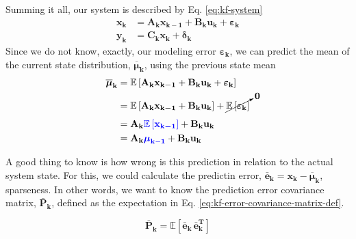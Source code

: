 \documentclass[12pt]{article}
\newcommand{\bvec}[1]{\boldsymbol{\mathbf{#1}}} %
\newcommand{\bvecT}[1]{\boldsymbol{\mathbf{#1^T}}} %
\newcommand{\mat}[1]{\boldsymbol{\mathbf{#1}}}
\newcommand{\brac}[1]{\left[#1\right]} %
\newcommand{\mb}[1]{{\boldsymbol{#1}}} %
\newcommand{\expv}[1]{\mathbb{E}\brac{#1}} %
\newcommand{\blue}[1]{\color{blue}#1\color{black}}
\begin{document}
Summing it all, our system is described by Eq. \ref{eq:kf-system}
\begin{equation}
    \begin{aligned}
        \bvec{x_k} &= \mat{A_k}\bvec{x_{k-1}} + \mat{B_k}\bvec{u_k} + \mb{\varepsilon}_\mathbf{k}\\
        \bvec{y_k} &= \mat{C_k}\bvec{x_k} + \mb{\delta}_\mathbf{k}
    \end{aligned}
    \label{eq:kf-system}
\end{equation}
Since we do not know, exactly, our modeling error $\mb{\varepsilon}_\mathbf{k}$, we can predict the mean of the current state distribution, $\mb{\overline{\mu}}_\mathbf{k}$, using the previous state mean
\begin{equation}
    \begin{aligned}
        \mb{\overline{\mu}}_\mathbf{k} &= \expv{\mat{A_k}\bvec{x_{k-1}} + \mat{B_k}\bvec{u_k} + \mb{\varepsilon}_\mathbf{k}}\\
        & = \expv{\mat{A_k}\bvec{x_{k-1}} + \mat{B_k}\bvec{u_k}} + \cancelto{\mat{0}}{\expv{\mb{\varepsilon}_\mathbf{k}}}\\
        &= \mat{A_k}\blue{\expv{\bvec{x_{k-1}}}} + \mat{B_k}\bvec{u_k}\\
        &= \mat{A_k}\blue{\mb{\mu}_\mathbf{k-1}} + \mat{B_k}\bvec{u_k}
    \end{aligned}
    \label{eq:kf-prdiction}
\end{equation}

A good thing to know is how wrong is this prediction in relation to the actual system state. For this, we could calculate the predictin error, $\bvec{\bar{e}_k} = \bvec{x_k} - \mb{\overline{\mu}}_\mathbf{k}$, sparseness. In other words, we want to know the prediction error covariance matrix, $\mat{\bar{P}_k}$, defined as the expectation in Eq. \ref{eq:kf-error-covariance-matrix-def}.

\begin{equation}
    \mat{\bar{P}_k} = \expv{\bvec{\bar{e}_k} \, \bvecT{\bar{e}_k}}
    \label{eq:kf-error-covariance-matrix-def}
\end{equation}
\end{document}

